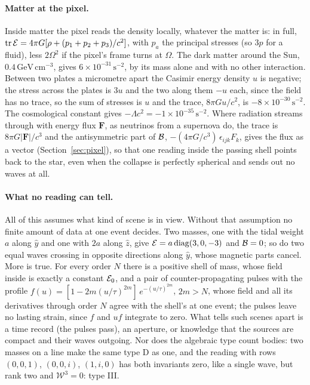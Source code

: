 \paragraph{Matter at the pixel.} Inside matter the pixel reads the density
locally, whatever the matter is: in full,
$\mathrm{tr}\,\mathcal{E} = 4\pi G[\rho + (p_1 + p_2 + p_3)/c^2]$, with $p_a$ the
principal stresses (so $3p$ for a fluid), less $2\Omega^2$ if the pixel's frame
turns at $\Omega$. The dark matter around the Sun, $0.4\,\mathrm{GeV\,cm^{-3}}$,
gives $6\times10^{-31}\,\mathrm{s^{-2}}$, by its mass alone and with no other
interaction. Between two plates a micrometre apart the Casimir energy density $u$ is
negative; the stress across the plates is $3u$ and the two along them $-u$
each, since the field has no trace, so the sum of stresses is $u$ and the trace,
$8\pi Gu/c^2$, is $-8\times10^{-30}\,\mathrm{s^{-2}}$. The cosmological constant gives
$-\Lambda c^2 = -1\times10^{-35}\,\mathrm{s^{-2}}$. Where radiation streams
through with energy flux $\mathbf F$, as neutrinos from a supernova do, the trace
is $8\pi G|\mathbf F|/c^3$ and the antisymmetric part of $\mathcal{B}$,
$-(4\pi G/c^3)\,\epsilon_{ijk}F_k$, gives the flux as a vector
(Section~\ref{sec:pixel}), so that
one reading inside the passing shell points back to the star, even when the
collapse is perfectly spherical and sends out no waves at all.

\paragraph{What no reading can tell.} All of this assumes what kind of scene
is in view. Without that assumption no finite amount of data at one event
decides. Two masses, one with the tidal weight $a$ along $\hat y$ and one with
$2a$ along $\hat z$, give $\mathcal{E} = a\,\mathrm{diag}(3,0,-3)$ and $\mathcal{B} = 0$; so do
two equal waves crossing in opposite directions along $\hat y$, whose magnetic
parts cancel. More is true. For every order $N$ there is a positive shell of
mass, whose field inside is exactly a constant $\mathcal{E}_0$, and a pair of
counter-propagating pulses with the profile
$f(u) = [1 - 2m(u/\tau)^{2m}]\,e^{-(u/\tau)^{2m}}$, $2m > N$, whose field and
all its derivatives through order $N$ agree with the shell's at one event; the
pulses leave no lasting strain, since $f$ and $uf$ integrate to zero. What tells such scenes apart is a time
record (the pulses pass), an aperture, or knowledge that the sources are
compact and their waves outgoing. Nor does the algebraic type count bodies:
two masses on a line make the same type D as one, and the reading with rows
$(0,0,1)$, $(0,0,i)$, $(1,i,0)$ has both invariants zero, like a single wave,
but rank two and $\mathcal W^3 = 0$: type III.

